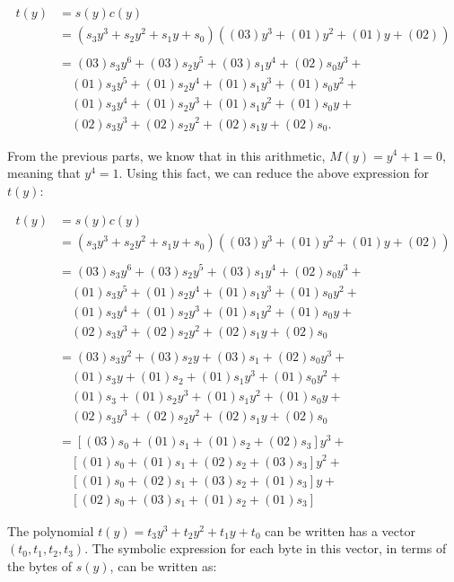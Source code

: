 \documentclass[11pt]{article}
\theoremstyle{definition}
\begin{document}
\begin{enumerate}
\begin{enumerate}
\begin{enumerate}
\begin{align*}
    t(y) &= s(y)c(y) \\
    &= (s_3y^3 + s_2y^2 + s_1y + s_0)((03)y^3 + (01)y^2 + (01)y + (02)) \\ \\
    &= (03)s_3y^6 + (03)s_2y^5 + (03)s_1y^4 + (02)s_0y^3 + \\
    & \quad (01)s_3y^5 + (01)s_2y^4 + (01)s_1y^3 + (01)s_0y^2 + \\
    & \quad (01)s_3y^4 + (01)s_2y^3 + (01)s_1y^2 + (01)s_0y + \\
    & \quad (02)s_3y^3 + (02)s_2y^2 + (02)s_1y + (02)s_0.
\end{align*}

From the previous parts, we know that in this arithmetic, $M(y) = y^4 + 1 = 0$, meaning that $y^4 = 1$. Using this fact, we can reduce the above expression for $t(y)$:

\begin{align*}
    t(y) &= s(y)c(y) \\
    &= (s_3y^3 + s_2y^2 + s_1y + s_0)((03)y^3 + (01)y^2 + (01)y + (02)) \\ \\
    &= (03)s_3y^6 + (03)s_2y^5 + (03)s_1y^4 + (02)s_0y^3 + \\
    & \quad (01)s_3y^5 + (01)s_2y^4 + (01)s_1y^3 + (01)s_0y^2 + \\
    & \quad (01)s_3y^4 + (01)s_2y^3 + (01)s_1y^2 + (01)s_0y + \\
    & \quad (02)s_3y^3 + (02)s_2y^2 + (02)s_1y + (02)s_0 \\ \\
    &= (03)s_3y^2 + (03)s_2y + (03)s_1 + (02)s_0y^3 + \\
    & \quad (01)s_3y + (01)s_2 + (01)s_1y^3 + (01)s_0y^2 + \\
    & \quad (01)s_3 + (01)s_2y^3 + (01)s_1y^2 + (01)s_0y + \\
    & \quad (02)s_3y^3 + (02)s_2y^2 + (02)s_1y + (02)s_0 \\ \\
    &= [(03)s_0 + (01)s_1 + (01)s_2 + (02)s_3]y^3 + \\
    & \quad [(01)s_0 + (01)s_1 + (02)s_2 + (03)s_3]y^2 + \\
    & \quad [(01)s_0 + (02)s_1 + (03)s_2 + (01)s_3]y + \\
    & \quad [(02)s_0 + (03)s_1 + (01)s_2 + (01)s_3]
\end{align*}

The polynomial $t(y) = t_3y^3 + t_2y^2 + t_1y + t_0$ can be written has a vector $(t_0, t_1, t_2, t_3)$. The symbolic expression for each byte in this vector, in terms of the bytes of $s(y)$, can be written as:


\end{enumerate}
\end{enumerate}
\end{enumerate}
\end{document}
